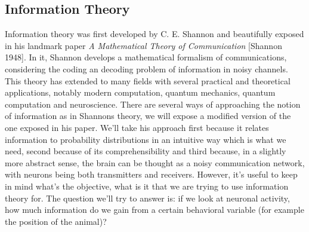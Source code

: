\subsection{Information Theory}
\label{chap1:sec:3:subsec1:information_theory}
Information theory was first developed by C. E. Shannon and beautifully exposed in his landmark paper \textit{A Mathematical Theory of Communication} [Shannon 1948].
In it, Shannon develops a mathematical formalism of communications, considering the coding an decoding problem of information in noisy channels.
This theory has extended to many fields with several practical and theoretical applications, notably modern computation, quantum mechanics, quantum computation and neuroscience.
There are several ways of approaching the notion of information as in Shannons theory, we will expose a modified version of the one exposed in his paper.
We'll take his approach first because it relates information to probability distributions in an intuitive way which is what we need, second because of its comprehensibility and third because, in a slightly more abstract sense, the brain can be thought as a noisy communication network, with neurons being both transmitters and receivers.
However, it's useful to keep in mind what's the objective, what is it that we are trying to use information theory for. 
The question we'll try to answer is: if we look at neuronal activity, how much information do we gain from a certain behavioral variable (for example the position of the animal)? 

